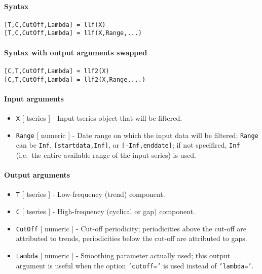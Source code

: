 


	\paragraph{Syntax}

\begin{verbatim}
[T,C,CutOff,Lambda] = llf(X)
[T,C,CutOff,Lambda] = llf(X,Range,...)
\end{verbatim}

\paragraph{Syntax with output arguments
swapped}

\begin{verbatim}
[C,T,CutOff,Lambda] = llf2(X)
[C,T,CutOff,Lambda] = llf2(X,Range,...)
\end{verbatim}

\paragraph{Input arguments}

\begin{itemize}
\item
  \texttt{X} {[} tseries {]} - Input tseries object that will be
  filtered.
\item
  \texttt{Range} {[} numeric {]} - Date range on which the input data
  will be filtered; \texttt{Range} can be \texttt{Inf},
  \texttt{{[}startdata,Inf{]}}, or \texttt{{[}-Inf,enddate{]}}; if not
  specifired, \texttt{Inf} (i.e.~the entire available range of the input
  series) is used.
\end{itemize}

\paragraph{Output arguments}

\begin{itemize}
\item
  \texttt{T} {[} tseries {]} - Low-frequency (trend) component.
\item
  \texttt{C} {[} tseries {]} - High-frequency (cyclical or gap)
  component.
\item
  \texttt{CutOff} {[} numeric {]} - Cut-off periodicity; periodicities
  above the cut-off are attributed to trends, periodicities below the
  cut-off are attributed to gaps.
\item
  \texttt{Lambda} {[} numeric {]} - Smoothing parameter actually used;
  this output argument is useful when the option \texttt{'cutoff='} is
  used instead of \texttt{'lambda='}.
\end{itemize}

